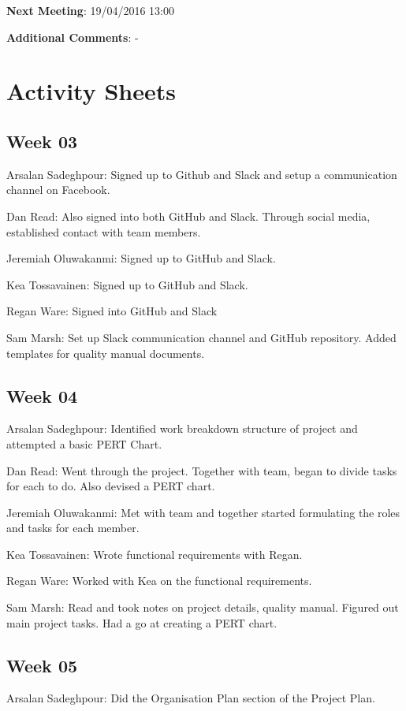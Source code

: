 \documentclass[11pt]{article}
\begin{document}
\textbf{Next Meeting}: 19/04/2016 13:00

\textbf{Additional Comments}: -

\section{Activity Sheets}

\subsection{Week 03}

Arsalan Sadeghpour: Signed up to Github and Slack and setup a communication channel on Facebook.

Dan Read: Also signed into both GitHub and Slack. Through social media, established contact with team members.

Jeremiah Oluwakanmi: Signed up to GitHub and Slack.

Kea Tossavainen: Signed up to GitHub and Slack.

Regan Ware: Signed into GitHub and Slack

Sam Marsh: Set up Slack communication channel and GitHub repository. Added templates for quality manual documents.

\subsection{Week 04}

Arsalan Sadeghpour: Identified work breakdown structure of project and attempted a basic PERT Chart.

Dan Read: Went through the project. Together with team, began to divide tasks for each to do. Also devised a PERT chart.

Jeremiah Oluwakanmi: Met with team and together started formulating the roles and tasks for each member.

Kea Tossavainen: Wrote functional requirements with Regan.

Regan Ware: Worked with Kea on the functional requirements.

Sam Marsh: Read and took notes on project details, quality manual. Figured out main project tasks. Had a go at creating a PERT chart.

\subsection{Week 05}

Arsalan Sadeghpour: Did the Organisation Plan section of the Project Plan.
\end{document}
